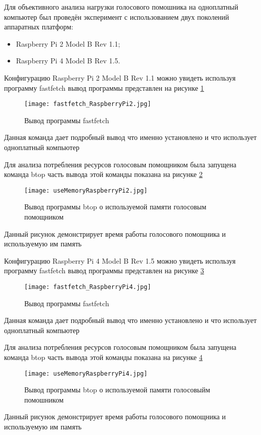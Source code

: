 Для объективного анализа нагрузки голосового помошника на одноплатный компьютер был проведён эксперимент с использованием двух поколений аппаратных платформ:
\begin{itemize}
	\item Raspberry Pi 2 Model B Rev 1.1;
	\item Raspberry Pi 4 Model B Rev 1.5.
\end{itemize}

Конфигурацию Raspberry Pi 2 Model B Rev 1.1 можно увидеть используя программу fastfetch вывод программы представлен на рисунке \ref{fig:fastfetch_RaspberryPi2}

\begin{figure}[H]
	\centering
	\texttt{[image: fastfetch\_RaspberryPi2.jpg]}
	\caption{Вывод программы fastfetch}
	\label{fig:fastfetch_RaspberryPi2}
\end{figure}
Данная команда дает подробный вывод что именно установлено и что использует одноплатный компьютер

Для анализа потребления ресурсов голосовым помощником была запущена команда btop часть вывода этой команды показана на рисунке \ref{fig:useMemoryRaspberryPi2}

\begin{figure}[H]
	\centering
	\texttt{[image: useMemoryRaspberryPi2.jpg]}
	\caption{Вывод программы btop о используемой памяти голосовым помощником}
	\label{fig:useMemoryRaspberryPi2}
\end{figure}
Данный рисунок демонстрирует время работы голосового помощника и используемую им память 

Конфигурацию Raspberry Pi 4 Model B Rev 1.5 можно увидеть используя программу fastfetch вывод программы представлен на рисунке \ref{fig:fastfetch_RaspberryPi4}

\begin{figure}[H]
	\centering
	\texttt{[image: fastfetch\_RaspberryPi4.jpg]}
	\caption{Вывод программы fastfetch}
	\label{fig:fastfetch_RaspberryPi4}
\end{figure}
Данная команда дает подробный вывод что именно установлено и что использует одноплатный компьютер

Для анализа потребления ресурсов голосовым помощником была запущена команда btop часть вывода этой команды показана на рисунке \ref{fig:useMemoryRaspberryPi4}

\begin{figure}[H]
	\centering
	\texttt{[image: useMemoryRaspberryPi4.jpg]}
	\caption{Вывод программы btop о используемой памяти голосовыйм помошником}
	\label{fig:useMemoryRaspberryPi4}
\end{figure}
Данный рисунок демонстрирует время работы голосового помощника и используемую им память 

